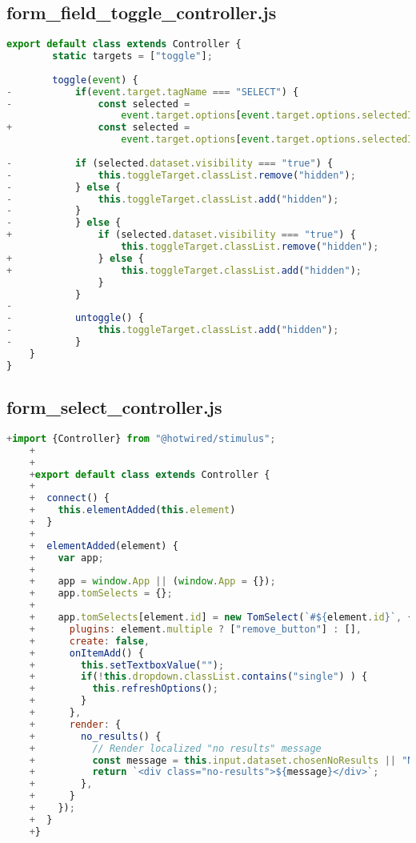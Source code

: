 \newpage

\subsection{form\_field\_toggle\_controller.js}
\begin{lstlisting}[language=JavaScript]
export default class extends Controller {
        static targets = ["toggle"];
      
        toggle(event) {
-           if(event.target.tagName === "SELECT") {
-               const selected = 
                    event.target.options[event.target.options.selectedIndex];
+               const selected = 
                    event.target.options[event.target.options.selectedIndex];
      
-           if (selected.dataset.visibility === "true") {
-               this.toggleTarget.classList.remove("hidden");
-           } else {
-               this.toggleTarget.classList.add("hidden");
-           }
-           } else {
+               if (selected.dataset.visibility === "true") {
                    this.toggleTarget.classList.remove("hidden");
+               } else {
+                   this.toggleTarget.classList.add("hidden");
                }
            }
-
-           untoggle() {
-               this.toggleTarget.classList.add("hidden");
-           }
    }    
}    
\end{lstlisting}

\newpage

\subsection{form\_select\_controller.js}
\begin{lstlisting}[language=JavaScript]
    +import {Controller} from "@hotwired/stimulus";
    +
    +
    +export default class extends Controller {
    +
    +  connect() {
    +    this.elementAdded(this.element)
    +  }
    +
    +  elementAdded(element) {
    +    var app;
    +
    +    app = window.App || (window.App = {});
    +    app.tomSelects = {};
    +
    +    app.tomSelects[element.id] = new TomSelect(`#${element.id}`, {
    +      plugins: element.multiple ? ["remove_button"] : [],
    +      create: false,
    +      onItemAdd() {
    +        this.setTextboxValue("");
    +        if(!this.dropdown.classList.contains("single") ) {
    +          this.refreshOptions();
    +        }
    +      },
    +      render: {
    +        no_results() {
    +          // Render localized "no results" message
    +          const message = this.input.dataset.chosenNoResults || "No results found";
    +          return `<div class="no-results">${message}</div>`;
    +        },
    +      }
    +    });
    +  }
    +}    
\end{lstlisting}

